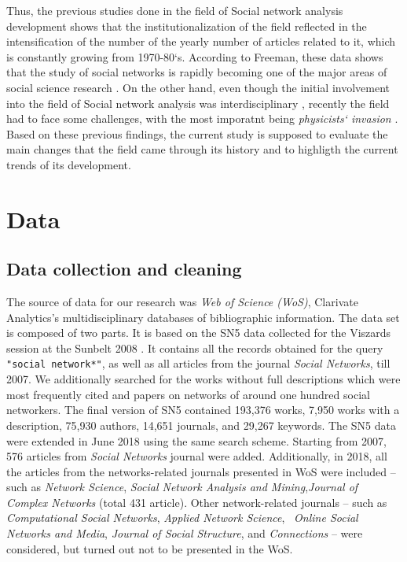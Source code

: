 \documentclass[11pt]{article} %
\begin{document}
Thus, the previous studies done in the field of Social network analysis development shows that the institutionalization of the field reflected in the intensification of the number of the yearly number of articles related to it, which is constantly growing from 1970-80`s. According to Freeman, these data shows that the study of social networks is rapidly becoming one of the major areas of social science research  \citep{SNAdev}. On the other hand, even though the initial involvement into the field of Social network analysis was interdisciplinary \citep{normSci}, recently the field had to face  some challenges, with the most imporatnt being \textit{physicists` invasion} \citep{lazer,brandes,Understand}. Based on these previous findings, the current study is supposed to evaluate the main changes that the field came through its history and to highligth the current trends of its development. \medskip


\section{Data}

\subsection{Data collection and cleaning}

The source of data for our research was \textit{Web of Science (WoS)}, Clarivate Analytics’s multidisciplinary databases of bibliographic information. The data set is composed of two parts. It is based on the  SN5 data collected for the Viszards session at the Sunbelt 2008 \citep{Understand}. It contains all the records obtained for the query  \texttt {"social network*"}, as well as all articles from the journal \textit{Social Networks}, till 2007. We additionally searched for the works without full descriptions which were most frequently cited and papers on networks of around one hundred social networkers. The final version of SN5 contained 193,376 works,  7,950 works with a description,  75,930 authors,  14,651 journals, and  29,267 keywords. The SN5 data were extended  in June 2018 using the same search scheme. Starting from 2007, 576 articles from \textit{Social Networks} journal were added. Additionally, in 2018, all the articles from the networks-related journals presented in WoS were included -- such as \textit{Network Science}, \textit{Social Network Analysis and Mining},\textit{Journal of Complex  Networks} (total 431 article). Other network-related journals -- such as  \textit{Computational Social Networks}, \textit{Applied Network Science}, \ \textit{Online Social Networks and Media},  \textit{Journal of Social Structure}, and \textit{Connections} -- were considered, but turned out not to be presented in the WoS. \medskip
\end{document}
